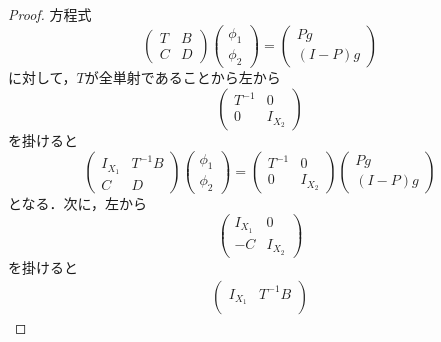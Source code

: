 \begin{proof}
  方程式
  \begin{equation*}
    \begin{pmatrix}
      T & B \\
      C & D
    \end{pmatrix}
    \begin{pmatrix}
      \phi_1 \\
      \phi_2
    \end{pmatrix}
    =
    \begin{pmatrix}
      Pg \\
      (I-P)g
    \end{pmatrix}
  \end{equation*}
  に対して，$T$が全単射であることから左から
  \begin{equation*}
    \begin{pmatrix}
      T^{-1} & 0 \\
      0 & I_{X_2}
    \end{pmatrix}
  \end{equation*}
  を掛けると
  \begin{equation*}
    \begin{pmatrix}
      I_{X_1} & T^{-1}B \\
      C & D
    \end{pmatrix}
    \begin{pmatrix}
      \phi_1 \\
      \phi_2
    \end{pmatrix}
    =
    \begin{pmatrix}
      T^{-1} & 0 \\
      0 & I_{X_2}
    \end{pmatrix}
    \begin{pmatrix}
      Pg \\
      (I-P)g
    \end{pmatrix}
  \end{equation*}
  となる．次に，左から
  \begin{equation*}
    \begin{pmatrix}
      I_{X_1} & 0 \\
      -C & I_{X_2}
    \end{pmatrix}
  \end{equation*}
  を掛けると
  \begin{equation}
    \label{eq:6-4}
    \begin{split}
      \begin{pmatrix}
        I_{X_1} & T^{-1}B \\

\end{pmatrix}
\end{split}
\end{equation}
\end{proof}
